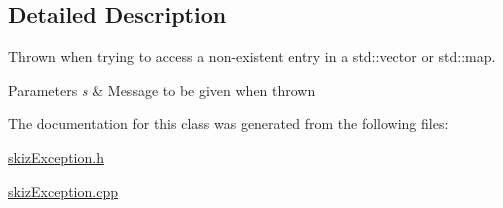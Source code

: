 \subsection{Detailed Description}
Thrown when trying to access a non-\/existent entry in a std\+::vector or std\+::map. 


\begin{DoxyParams}{Parameters}
{\em s} & Message to be given when thrown \\
\hline
\end{DoxyParams}


The documentation for this class was generated from the following files\+:\begin{DoxyCompactItemize}
\item 
\mbox{\hyperlink{skizException_8h}{skiz\+Exception.\+h}}\item 
\mbox{\hyperlink{skizException_8cpp}{skiz\+Exception.\+cpp}}\end{DoxyCompactItemize}
